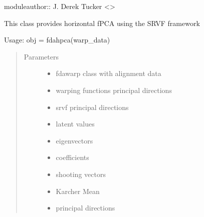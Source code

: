 \documentclass[letterpaper,10pt,english]{sphinxmanual}
\begin{document}
moduleauthor:: J. Derek Tucker \textless{}\textgreater{}

\begin{fulllineitems}
\label{\detokenize{fPCA:fPCA.fdahpca}}
This class provides horizontal fPCA using the
SRVF framework

Usage:  obj = fdahpca(warp\_data)
\begin{quote}\begin{description}
\item[{Parameters}] \leavevmode\begin{itemize}
\item {} 
 \textendash{} fdawarp class with alignment data

\item {} 
 \textendash{} warping functions principal directions

\item {} 
 \textendash{} srvf principal directions

\item {} 
 \textendash{} latent values

\item {} 
 \textendash{} eigenvectors

\item {} 
 \textendash{} coefficients

\item {} 
 \textendash{} shooting vectors

\item {} 
 \textendash{} Karcher Mean

\item {} 
 \textendash{} principal directions

\end{itemize}

\end{description}\end{quote}


\end{fulllineitems}
\end{document}
